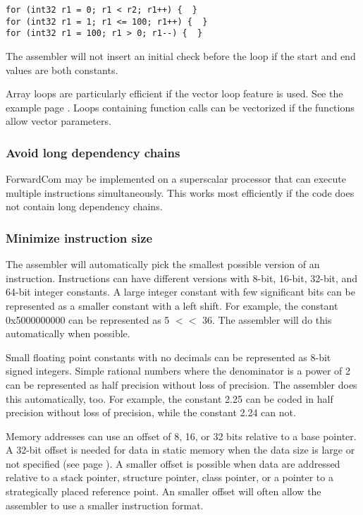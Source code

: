 \documentclass[forwardcom.tex]{subfiles}
\begin{document}
\begin{lstlisting}[frame=single]
for (int32 r1 = 0; r1 < r2; r1++) {  }
for (int32 r1 = 1; r1 <= 100; r1++) {  }
for (int32 r1 = 100; r1 > 0; r1--) {  }
\end{lstlisting}

The assembler will not insert an initial check before the loop if the start and end values are both constants.
\vv

Array loops are particularly efficient if the vector loop feature is used. See the example page \pageref{examplePolyn}. 
Loops containing function calls can be vectorized if the functions allow vector parameters.
\vv

\subsubsection{Avoid long dependency chains}
ForwardCom may be implemented on a superscalar processor that can execute multiple instructions simultaneously. This works most efficiently if the code does not contain long dependency chains.
\vv

\subsubsection{Minimize instruction size}
The assembler will automatically pick the smallest possible version of an instruction. 
Instructions can have different versions with 8-bit, 16-bit, 32-bit, and 64-bit integer constants. 
A large integer constant with few significant bits can be represented as a smaller constant with a left shift. For example, the constant 0x5000000000 can be represented as 5 $<<$ 36. The assembler will do this automatically when possible.
\vv

Small floating point constants with no decimals can be represented as 8-bit signed integers. Simple rational numbers where the denominator is a power of 2 can be represented as half precision without loss of precision. The assembler does this automatically, too. For example, the constant 2.25 can be coded in half precision without loss of precision, while the constant 2.24 can not.
\vv

Memory addresses can use an offset of 8, 16, or 32 bits relative to a base pointer. 
A 32-bit offset is needed for data in static memory when the data size is large or not specified (see page \pageref{SpecifyDataSize}). A smaller offset is possible when data are addressed relative to a stack pointer, structure pointer, class pointer, or a pointer to a strategically placed reference point. An smaller offset will often allow the assembler to use a smaller instruction format.
\vv
\end{document}
